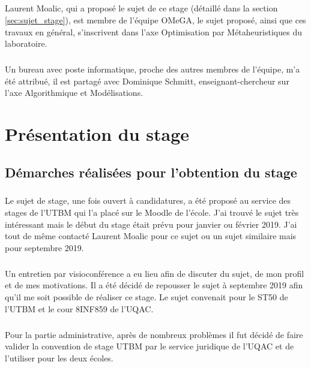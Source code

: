 \documentclass[a4paper,11pt,twoside,french,report]{../common/simplem}
\begin{document}
				\paragraph*{}
					Laurent Moalic, qui a proposé le sujet de ce stage (détaillé dans la section \ref{sec:sujet_stage}), est membre de l'équipe \gls{OMeGA}, le sujet proposé, ainsi que ces travaux en général, s’inscrivent dans l'axe Optimisation par Métaheuristiques du laboratoire.
				\paragraph*{}
					Un bureau avec poste informatique, proche des autres membres de l'équipe, m'a été attribué, il est partagé avec Dominique Schmitt, enseignant-chercheur sur l'axe Algorithmique et Modélisations.
	\chapter{Présentation du stage}
		\section{Démarches réalisées pour l’obtention du stage}
			\paragraph*{}
				Le sujet de stage, une fois ouvert à candidatures, a été proposé au service des stages de l'\gls{UTBM} qui l'a placé sur le Moodle de l'école. J'ai trouvé le sujet très intéressant mais le début du stage était prévu pour janvier ou février 2019. J'ai tout de même contacté Laurent Moalic pour ce sujet ou un sujet similaire mais pour septembre 2019.
			\paragraph*{}
				Un entretien par visioconférence a eu lieu afin de discuter du sujet, de mon profil et de mes motivations. Il a été décidé de repousser le sujet à septembre 2019 afin qu'il me soit possible de réaliser ce stage. Le sujet convenait pour le ST50 de l'\gls{UTBM} et le cour \gls{8INF859} de l'\gls{UQAC}.
			\paragraph*{}
				Pour la partie administrative, après de nombreux problèmes il fut décidé de faire valider la convention de stage \gls{UTBM} par le service juridique de l'\gls{UQAC} et de l'utiliser pour les deux écoles.
\end{document}
